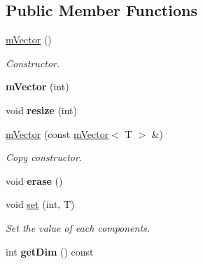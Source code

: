 \subsection*{Public Member Functions}
\begin{DoxyCompactItemize}
\item 
\mbox{\label{classmVector_a5aad638cf6e1cde4ea630ba1235b6d4e}} 
\hyperlink{classmVector_a5aad638cf6e1cde4ea630ba1235b6d4e}{m\+Vector} ()
\begin{DoxyCompactList}\small\item\em Constructor. \end{DoxyCompactList}\item 
\mbox{\label{classmVector_a8c7b3bad50a6ced368ee66707733933c}} 
{\bfseries m\+Vector} (int)
\item 
\mbox{\label{classmVector_a3f49c8d14ab7d7d87e61dc2b42e82108}} 
void {\bfseries resize} (int)
\item 
\mbox{\label{classmVector_a67ae39d7b75ba54c0ab9b50fae7c96e0}} 
\hyperlink{classmVector_a67ae39d7b75ba54c0ab9b50fae7c96e0}{m\+Vector} (const \hyperlink{classmVector}{m\+Vector}$<$ T $>$ \&)
\begin{DoxyCompactList}\small\item\em Copy constructor. \end{DoxyCompactList}\item 
\mbox{\label{classmVector_a19af4a5b9c9b4523a4130e97dcf8540b}} 
void {\bfseries erase} ()
\item 
\mbox{\label{classmVector_afd914d9173d2c05d7239230479c04422}} 
void \hyperlink{classmVector_afd914d9173d2c05d7239230479c04422}{set} (int, T)
\begin{DoxyCompactList}\small\item\em Set the value of each components. \end{DoxyCompactList}\item 
\mbox{\label{classmVector_a93cdb60132eb8145e9394d83f269f9b0}} 
int {\bfseries get\+Dim} () const
\item 
\mbox{\label{classmVector_a581f723f77bfafe89a26942ae77db72b}} 

\end{DoxyCompactItemize}
